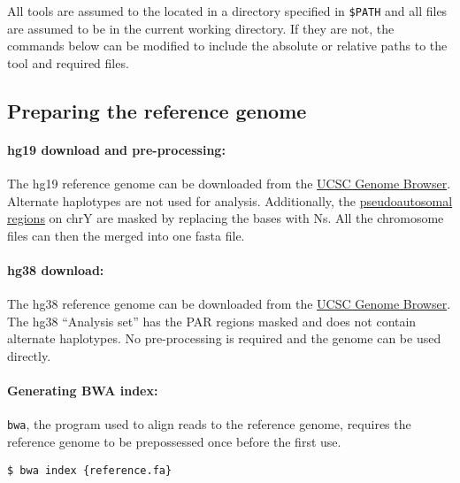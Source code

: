 \documentclass[11pt]{article}
\newcommand{\prog}[1]{\texttt{#1}}
\begin{document}
All tools are assumed to the located in a directory specified in
\texttt{\$PATH} and all files are assumed to be in the current working
directory. If they are not, the commands below can be modified to
include the absolute or relative paths to the tool and required files.

\subsection{Preparing the reference genome}
\label{index}
\paragraph{hg19 download and pre-processing:}
The hg19 reference genome can be downloaded from the
\href{http://hgdownload.cse.ucsc.edu/goldenpath/hg19/bigZips/chromFa.tar.gz}
{UCSC Genome Browser}. Alternate haplotypes are not used for analysis.
Additionally, the
\href{https://en.wikipedia.org/wiki/Pseudoautosomal\_region}{pseudoautosomal
regions} on chrY are masked by replacing the bases with Ns. All the
chromosome files can then the merged into one fasta file.

\paragraph{hg38 download:}
The hg38 reference genome can be downloaded from the 
\href{https://hgdownload.soe.ucsc.edu/goldenPath/hg38/bigZips/analysisSet/hg38.analysisSet.fa.gz}
{UCSC Genome Browser}. 
The hg38 ``Analysis set'' has the PAR regions masked and does not
contain alternate haplotypes. No pre-processing is required and the genome
can be used directly. 

\paragraph{Generating BWA index:}
\prog{bwa}, the program used to align reads to the reference genome,
requires the reference genome to be prepossessed once before the first
use.
\begin{verbatim}
$ bwa index {reference.fa}
\end{verbatim}

\end{document}
